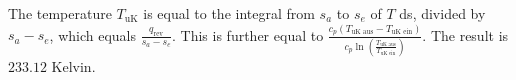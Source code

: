The temperature \( T_{\text{uK}} \) is equal to the integral from \( s_a \) to \( s_e \) of \( T \) ds, divided by \( s_a - s_e \), which equals \( \frac{q_{\text{rev}}}{s_a - s_e} \). This is further equal to \( \frac{c_p (T_{\text{uK aus}} - T_{\text{uK ein}})}{c_p \ln \left( \frac{T_{\text{uK aus}}}{T_{\text{uK ein}}} \right)} \). The result is \( 233.12 \) Kelvin.
